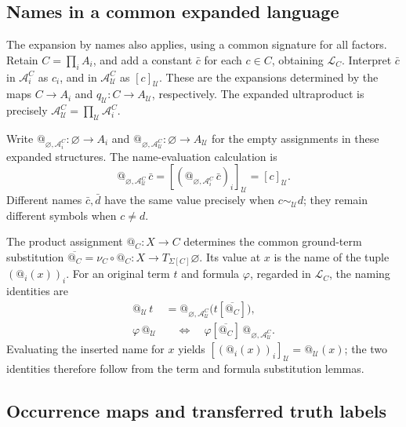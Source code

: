 \documentclass[11pt]{article}
\makeatletter
\newcommand{\atsign}{\mathord{@}}
\makeatother
\begin{document}
\subsection{Names in a common expanded language}

The expansion by names also applies, using a common signature for all
factors. Retain \(C=\prod_i A_i\), and add a constant \(\bar c\) for
each \(c\in C\), obtaining \(\mathcal L_C\).
Interpret \(\bar c\) in \(\mathcal A_i^C\) as \(c_i\), and in
\(\mathcal A_{\mathcal U}^C\) as \([c]_{\mathcal U}\).
These are the expansions determined by the maps
\(C\to A_i\) and \(q_{\mathcal U}:C\to A_{\mathcal U}\), respectively.
The expanded ultraproduct is precisely
\(\mathcal A_{\mathcal U}^C=\prod_{\mathcal U}\mathcal A_i^C\).

Write \(\atsign_{\varnothing,\mathcal A_i^C}:\varnothing\to A_i\) and
\(\atsign_{\varnothing,\mathcal A_{\mathcal U}^C}:\varnothing\to A_{\mathcal U}\)
for the empty assignments in these expanded structures. The name-evaluation calculation is
\[
\atsign_{\varnothing,\mathcal A_{\mathcal U}^C}\,\bar c
=[(\atsign_{\varnothing,\mathcal A_i^C}\,\bar c)_i]_{\mathcal U}
=[c]_{\mathcal U}.
\]
Different names \(\bar c,\bar d\) have the same value precisely when
\(c\sim_{\mathcal U}d\); they remain different symbols when \(c\neq d\).

The product assignment \(\atsign_C:X\to C\) determines the common
ground-term substitution
\(\overline{\atsign_C}=\nu_C\circ\atsign_C:
X\to T_{\Sigma[C]}\varnothing\).
Its value at \(x\) is the name of the tuple
\((\atsign_i(x))_i\).
For an original term \(t\) and formula \(\varphi\), regarded in
\(\mathcal L_C\), the naming identities are
\[
\begin{aligned}
\atsign_{\mathcal U}\,t
&=\atsign_{\varnothing,\mathcal A_{\mathcal U}^C}
       \bigl(t[\overline{\atsign_C}]\bigr),\\
\varphi\,\atsign_{\mathcal U}
&\quad\Longleftrightarrow\quad
\varphi[\overline{\atsign_C}]\,
       \atsign_{\varnothing,\mathcal A_{\mathcal U}^C}.
\end{aligned}
\]
Evaluating the inserted name for \(x\) yields
\([(\atsign_i(x))_i]_{\mathcal U}=\atsign_{\mathcal U}(x)\);
the two identities therefore follow from the term and formula
substitution lemmas.

\subsection{Occurrence maps and transferred truth labels}
\end{document}
